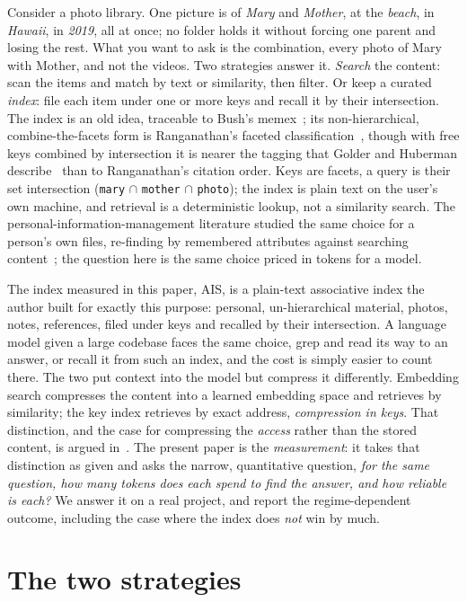 \documentclass[11pt]{article}
\newcommand{\code}[1]{\texttt{#1}}
\begin{document}
Consider a photo library. One picture is of \emph{Mary} and \emph{Mother}, at the
\emph{beach}, in \emph{Hawaii}, in \emph{2019}, all at once; no folder holds it
without forcing one parent and losing the rest. What you want to ask is the
combination, every photo of Mary with Mother, and not the videos. Two strategies
answer it. \emph{Search} the content: scan the items and match by text or
similarity, then filter. Or keep a curated \emph{index}: file each item under one
or more keys and recall it by their intersection. The index is an old idea,
traceable to Bush's memex~\cite{bush1945}; its non-hierarchical, combine-the-facets form is
Ranganathan's faceted classification~\cite{ranganathan1933}, though with free keys
combined by intersection it is nearer the tagging that Golder and Huberman
describe~\cite{golder2006} than to Ranganathan's citation order. Keys are facets, a query is their set
intersection (\code{mary} $\cap$ \code{mother} $\cap$ \code{photo}); the index is
plain text on the user's own machine, and retrieval is a deterministic lookup, not
a similarity search. The personal-information-management literature studied the
same choice for a person's own files, re-finding by remembered attributes against
searching content~\cite{dumais2003,jones2007}; the question here is the same choice
priced in tokens for a model.

The index measured in this paper, AIS, is a plain-text associative index the
author built for exactly this purpose: personal, un-hierarchical material, photos,
notes, references, filed under keys and recalled by their intersection. A language
model given a large codebase faces the same choice, grep and read its way to an
answer, or recall it from such an index, and the cost is simply easier to count
there. The two put context into the model but compress it differently. Embedding search
compresses the content into a learned embedding space and retrieves by similarity;
the key index retrieves by exact address, \emph{compression in keys}. That distinction, and the case for compressing the
\emph{access} rather than the stored content, is argued in~\cite{gavrilov2026}.
The present paper is the \emph{measurement}: it takes that distinction
as given and asks the narrow, quantitative question, \emph{for the same question,
how many tokens does each spend to find the answer, and how reliable is each?} We
answer it on a real project, and report the regime-dependent outcome,
including the case where the index does \emph{not} win by much.

\section{The two strategies}
\end{document}
